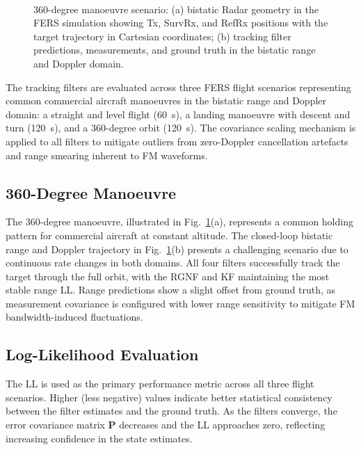\documentclass[conference]{IEEEtran}
\begin{document}
\begin{figure}[t]
\centering
\subfloat[]{%
  \label{fig:360_3D}%
}%
~
\subfloat[]{%
  \label{fig:360FilterOutputs}%
}%
\\[2.6mm]
\caption{360-degree manoeuvre scenario: (a) bistatic Radar geometry in the FERS simulation showing Tx, SurvRx, and RefRx positions with the target trajectory in Cartesian coordinates; (b) tracking filter predictions, measurements, and ground truth in the bistatic range and Doppler domain.}
\label{fig:360_scenario}
\end{figure}

The tracking filters are evaluated across three FERS flight scenarios representing common commercial aircraft manoeuvres in the bistatic range and Doppler domain: a straight and level flight (60~s), a landing manoeuvre with descent and turn (120~s), and a 360-degree orbit (120~s). The covariance scaling mechanism is applied to all filters to mitigate outliers from zero-Doppler cancellation artefacts and range smearing inherent to FM waveforms.

\subsection{360-Degree Manoeuvre}

The 360-degree manoeuvre, illustrated in Fig.~\ref{fig:360_scenario}(a), represents a common holding pattern for commercial aircraft at constant altitude. The closed-loop bistatic range and Doppler trajectory in Fig.~\ref{fig:360_scenario}(b) presents a challenging scenario due to continuous rate changes in both domains. All four filters successfully track the target through the full orbit, with the RGNF and KF maintaining the most stable range LL. Range predictions show a slight offset from ground truth, as measurement covariance is configured with lower range sensitivity to mitigate FM bandwidth-induced fluctuations.

\subsection{Log-Likelihood Evaluation}

The LL is used as the primary performance metric across all three flight scenarios. Higher (less negative) values indicate better statistical consistency between the filter estimates and the ground truth. As the filters converge, the error covariance matrix $\mathbf{P}$ decreases and the LL approaches zero, reflecting increasing confidence in the state estimates.
\end{document}
